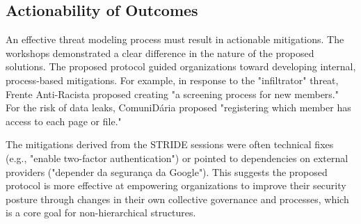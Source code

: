 \subsection{Actionability of Outcomes}
\label{subsec:actionability_outcomes}

An effective threat modeling process must result in actionable mitigations. The workshops
demonstrated a clear difference in the nature of the proposed solutions. The proposed
protocol guided organizations toward developing internal, process-based mitigations. For
example, in response to the "infiltrator" threat, Frente Anti-Racista proposed creating
"a screening process for new members." For the risk of data leaks, ComuniDária proposed
"registering which member has access to each page or file."

The mitigations derived from the STRIDE sessions were often technical fixes (e.g., "enable
two-factor authentication") or pointed to dependencies on external providers ("depender da
segurança da Google"). This suggests the proposed protocol is more effective at empowering
organizations to improve their security posture through changes in their own collective
governance and processes, which is a core goal for non-hierarchical structures.

